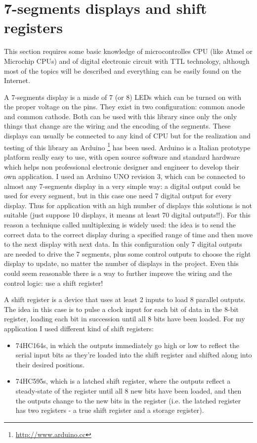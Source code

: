 \documentclass[11pt,english]{article}
\begin{document}
\section{7-segments displays and shift registers}\label{sec:7-seg}

This section requires some basic knowledge of microcontrolles CPU (like Atmel\texttrademark{}  
or Microchip\texttrademark{} CPUs) and of digital electronic circuit with TTL technology, 
although most of the topics will be described and everything can be easily found on the Internet.

A 7-segments display is a made of 7 (or 8) LEDs which can be turned on with the proper 
voltage on the pins. They exist in two configuration: common anode and common cathode. 
Both can be used with this library since only the only things that change are the wiring 
and the encoding of the segments. 
These displays can usually be connected to any kind of CPU but for the realization and 
testing of this library an Arduino \footnote{\url{http://www.arduino.cc}} has been used.
Arduino is a Italian prototype platform really easy to use, with open source software and 
standard hardware which helps non professional electronic designer and engineer to develop 
their own application. I used an Arduino UNO revision 3, which can be connected to almost any 
7-segments display in a very simple way: a digital output could be used for every segment, 
but in this case one need 7 digital output for every display. 
Thus for application with an high number of displays this solutions is not suitable 
(just suppose 10 displays, it means at least 70 digital outputs!!). 
For this reason a technique called multiplexing is widely used: 
the idea is to send the correct data to the correct display during a specified range of 
time and then move to the next display with next data. In this configuration only 7 
digital outputs are needed to drive the 7 segments, plus some control outputs to choose 
the right display to update, no matter the number of displays in the project.
Even this could seem reasonable there is a way to further improve the wiring and the 
control logic: use a shift register!

A shift register is a device that uses at least 2 inputs to load 8 parallel outputs. The 
idea in this case is to pulse a clock input for each bit of data in the 8-bit register, 
loading each bit in succession until all 8 bits have been loaded. For my application I 
used different kind of shift registers: 
\begin{itemize}
 \item 74HC164s, in which the outputs immediately go high or low to reflect the serial 
       input bits as they're loaded into the shift register and shifted along into their 
       desired positions. 
 \item 74HC595s, which is a latched shift register, where the outputs reflect a steady-state 
       of the register until all 8 new bits have been loaded, and then the outputs change to 
       the new bits in the register (i.e. the latched register has two registers - a true 
       shift register and a storage register).  
\end{itemize}
\end{document}

